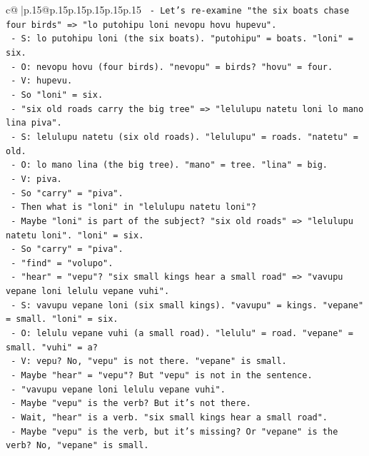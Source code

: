 \documentclass{article}
\begin{document}
{\begin{supertabular}{c@{$\;$}|p{.15\linewidth}@{}p{.15\linewidth}p{.15\linewidth}p{.15\linewidth}p{.15\linewidth}p{.15\linewidth}}
{{{\texttt{       {-} Let's re{-}examine "the six boats chase four birds" => "lo putohipu loni nevopu hovu hupevu".} \\
\texttt{       {-} S: lo putohipu loni (the six boats). "putohipu" = boats. "loni" = six.} \\
\texttt{       {-} O: nevopu hovu (four birds). "nevopu" = birds? "hovu" = four.} \\
\texttt{       {-} V: hupevu.} \\
\texttt{       {-} So "loni" = six.} \\
\texttt{       {-} "six old roads carry the big tree" => "lelulupu natetu loni lo mano lina piva".} \\
\texttt{       {-} S: lelulupu natetu (six old roads). "lelulupu" = roads. "natetu" = old.} \\
\texttt{       {-} O: lo mano lina (the big tree). "mano" = tree. "lina" = big.} \\
\texttt{       {-} V: piva.} \\
\texttt{       {-} So "carry" = "piva".} \\
\texttt{       {-} Then what is "loni" in "lelulupu natetu loni"?} \\
\texttt{       {-} Maybe "loni" is part of the subject? "six old roads" => "lelulupu natetu loni". "loni" = six.} \\
\texttt{       {-} So "carry" = "piva".} \\
\texttt{       {-} "find" = "volupo".} \\
\texttt{       {-} "hear" = "vepu"? "six small kings hear a small road" => "vavupu vepane loni lelulu vepane vuhi".} \\
\texttt{       {-} S: vavupu vepane loni (six small kings). "vavupu" = kings. "vepane" = small. "loni" = six.} \\
\texttt{       {-} O: lelulu vepane vuhi (a small road). "lelulu" = road. "vepane" = small. "vuhi" = a?} \\
\texttt{       {-} V: vepu? No, "vepu" is not there. "vepane" is small.} \\
\texttt{       {-} Maybe "hear" = "vepu"? But "vepu" is not in the sentence.} \\
\texttt{       {-} "vavupu vepane loni lelulu vepane vuhi".} \\
\texttt{       {-} Maybe "vepu" is the verb? But it's not there.} \\
\texttt{       {-} Wait, "hear" is a verb. "six small kings hear a small road".} \\
\texttt{       {-} Maybe "vepu" is the verb, but it's missing? Or "vepane" is the verb? No, "vepane" is small.} \\
}}}
\end{supertabular}}
\end{document}
